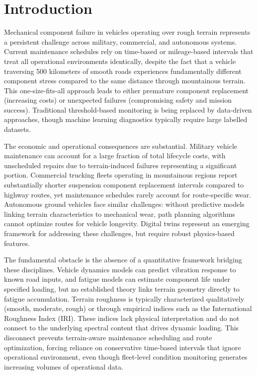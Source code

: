 \documentclass[11pt]{article}
\begin{document}
\newpage


\section*{Introduction}

Mechanical component failure in vehicles operating over rough terrain represents a persistent challenge across military, commercial, and autonomous systems. Current maintenance schedules rely on time-based or mileage-based intervals that treat all operational environments identically, despite the fact that a vehicle traversing 500 kilometers of smooth roads experiences fundamentally different component stress compared to the same distance through mountainous terrain. This one-size-fits-all approach leads to either premature component replacement (increasing costs) or unexpected failures (compromising safety and mission success). Traditional threshold-based monitoring is being replaced by data-driven approaches\cite{Chen2024}, though machine learning diagnostics typically require large labelled datasets\cite{Lei2020}.

The economic and operational consequences are substantial. Military vehicle maintenance can account for a large fraction of total lifecycle costs\cite{Wong2022}, with unscheduled repairs due to terrain-induced failures representing a significant portion. Commercial trucking fleets operating in mountainous regions report substantially shorter suspension component replacement intervals compared to highway routes, yet maintenance schedules rarely account for route-specific wear. Autonomous ground vehicles face similar challenges: without predictive models linking terrain characteristics to mechanical wear, path planning algorithms cannot optimize routes for vehicle longevity\cite{Yurtsever2020}. Digital twins represent an emerging framework\cite{Li2023} for addressing these challenges, but require robust physics-based features.

The fundamental obstacle is the absence of a quantitative framework bridging these disciplines. Vehicle dynamics models can predict vibration response to known road inputs\cite{Wong2022,Gillespie1992}, and fatigue models can estimate component life under specified loading\cite{Basquin1910,Dowling2013}, but no established theory links terrain geometry directly to fatigue accumulation. Terrain roughness is typically characterized qualitatively (smooth, moderate, rough) or through empirical indices such as the International Roughness Index (IRI)\cite{ISO8608}. These indices lack physical interpretation and do not connect to the underlying spectral content that drives dynamic loading. This disconnect prevents terrain-aware maintenance scheduling and route optimization, forcing reliance on conservative time-based intervals that ignore operational environment, even though fleet-level condition monitoring generates increasing volumes of operational data\cite{Zhu2019}.
\end{document}
